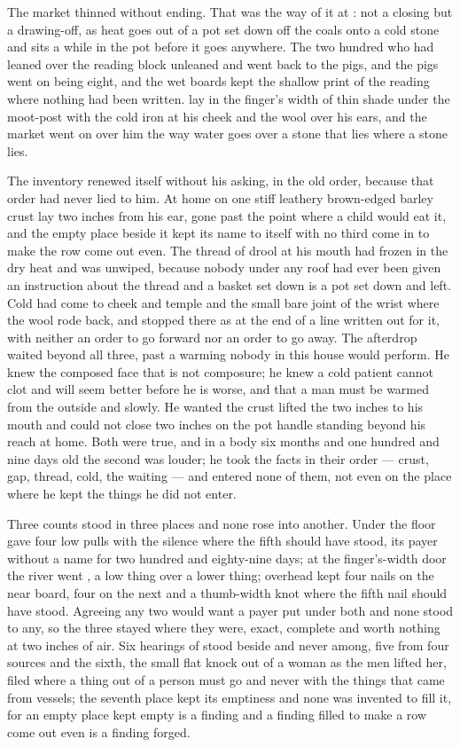 The market thinned without ending. That was the way of it at : not a closing but a drawing-off, as heat goes out of a pot set down off the coals onto a cold stone and sits a while in the pot before it goes anywhere. The two hundred who had leaned over the reading block unleaned and went back to the pigs, and the pigs went on being eight, and the wet boards kept the shallow print of the reading where nothing had been written.  lay in the finger's width of thin shade under the moot-post with the cold iron at his cheek and the wool over his ears, and the market went on over him the way water goes over a stone that lies where a stone lies.

The inventory renewed itself without his asking, in the old order, because that order had never lied to him. At home on  one stiff leathery brown-edged barley crust lay two inches from his ear, gone past the point where a child would eat it, and the empty place beside it kept its name to itself with no third come in to make the row come out even. The thread of drool at his mouth had frozen in the dry heat and was unwiped, because nobody under any roof had ever been given an instruction about the thread and a basket set down is a pot set down and left. Cold had come to cheek and temple and the small bare joint of the wrist where the wool rode back, and stopped there as at the end of a line written out for it, with neither an order to go forward nor an order to go away. The afterdrop waited beyond all three, past a warming nobody in this house would perform. He knew the composed face that is not composure; he knew a cold patient cannot clot and will seem better before he is worse, and that a man must be warmed from the outside and slowly. He wanted the crust lifted the two inches to his mouth and could not close two inches on the pot handle standing beyond his reach at home. Both were true, and in a body six months and one hundred and nine days old the second was louder; he took the facts in their order --- crust, gap, thread, cold, the waiting --- and entered none of them, not even on the place where he kept the things he did not enter.

Three counts stood in three places and none rose into another. Under the floor  gave four low pulls with the silence where the fifth should have stood, its payer without a name for two hundred and eighty-nine days; at the finger's-width door the river went , a low thing over a lower thing; overhead  kept four nails on the near board, four on the next and a thumb-width knot where the fifth nail should have stood. Agreeing any two would want a payer put under both and none stood to any, so the three stayed where they were, exact, complete and worth nothing at two inches of air. Six hearings of  stood beside and never among, five from four sources and the sixth, the small flat knock out of a woman as the men lifted her, filed where a thing out of a person must go and never with the things that came from vessels; the seventh place kept its emptiness and none was invented to fill it, for an empty place kept empty is a finding and a finding filled to make a row come out even is a finding forged.

